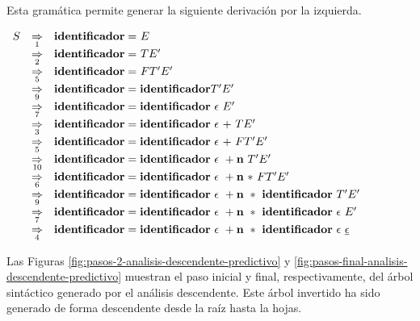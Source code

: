 Esta gramática permite generar la siguiente derivación por la izquierda.

\begin{center}
$
\begin{array}{lll}
  S & \Dflecha_1 & {\bf identificador =} \ E \\
   & \Dflecha_2 & {\bf identificador =} \ T E' \\
   & \Dflecha_5 & {\bf identificador =} \ F T' E' \\
   & \Dflecha_9 & {\bf identificador = identificador} T' E' \\
   & \Dflecha_7 & {\bf identificador = identificador \ \epsilon} \  E' \\
   & \Dflecha_3 & {\bf identificador = identificador \ \epsilon \ +} \ T E' \\
   & \Dflecha_5 & {\bf identificador = identificador \ \epsilon \ +} \ F T' E' \\
   & \Dflecha_{10} & {\bf identificador = identificador \ \epsilon \ + n} \ T' E' \\
   & \Dflecha_6 & {\bf identificador = identificador \ \epsilon \ + n \ *} \ F T' E'  \\
   & \Dflecha_9 & {\bf identificador = identificador \ \epsilon \ + n \ * \ identificador} \ T' E' \\
   & \Dflecha_7 & {\bf identificador = identificador \ \epsilon \ + n \ * \ identificador \ \epsilon} \ {E'} \\
   & \Dflecha_4 & {\bf identificador = identificador \ \epsilon \ + n \ * \ identificador \ \epsilon} \ \underline{\epsilon } 
\end{array}
$
\end{center}

Las Figuras \ref{fig:pasos-2-analisis-descendente-predictivo} y \ref{fig:pasos-final-analisis-descendente-predictivo} muestran el paso inicial y final, respectivamente, del árbol sintáctico generado por el análisis descendente. Este árbol invertido ha sido generado de forma descendente desde la raíz hasta la hojas.

